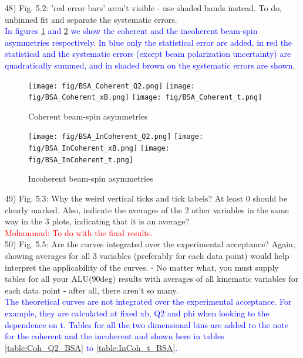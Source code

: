 48) Fig. 5.2: 'red error bars' aren't visible - use shaded bands instead.
    To do, unbinned fit and separate the systematic errors. \\
    \textcolor{blue}{In figures \ref{fig:coh_alu_sep} and 
       \ref{fig:incoh_alu_sep} we show the coherent and the incoherent 
       beam-spin asymmetries respectively. In blue only the statistical error 
       are added, in red the statistical and the systematic errors (except beam 
    polarization uncertainty) are quadratically summed, and in shaded brown on 
 the systematic errors are shown. } \\
 \begin{figure}[h!]
 \centering
 \texttt{[image: fig/BSA\_Coherent\_Q2.png]}
 \texttt{[image: fig/BSA\_Coherent\_xB.png]}
 \texttt{[image: fig/BSA\_Coherent\_t.png]}
 \caption{Coherent beam-spin asymmetries}
 \label{fig:coh_alu_sep}
 \end{figure}

 \begin{figure}[h!]
 \centering
 \texttt{[image: fig/BSA\_InCoherent\_Q2.png]}
 \texttt{[image: fig/BSA\_InCoherent\_xB.png]}
 \texttt{[image: fig/BSA\_InCoherent\_t.png]}
 \caption{Incoherent beam-spin asymmetries}
 \label{fig:incoh_alu_sep}
 \end{figure}



49) Fig. 5.3: Why the weird vertical ticks and tick labels? At least 0 should 
be clearly marked. Also, indicate the averages of the 2 other variables in the 
same way in the 3 plots, indicating that it is an average? \\
\textcolor{red}{Mohammad: To do with the final results.} \\

50) Fig. 5.5: Are the curves integrated over the experimental acceptance? 
Again, showing averages for all 3 variables (preferably for each data point) 
would help interpret the applicability of the curves.
- No matter what, you must supply tables for all your ALU(90deg) results with 
averages of all kinematic variables for each data point - after all, there 
aren't so many. \\

\textcolor{blue}{ The theoretical curves are not integrated over the 
   experimental acceptance. For example, they are calculated at fixed xb, Q2 
   and phi when looking to the dependence on t. Tables for all the two 
   dimensional bins are added to the note for the coherent and the incoherent 
   and shown here in tables \ref{table:Coh_Q2_BSA} to \ref{table:InCoh_t_BSA}.  
} \\  

